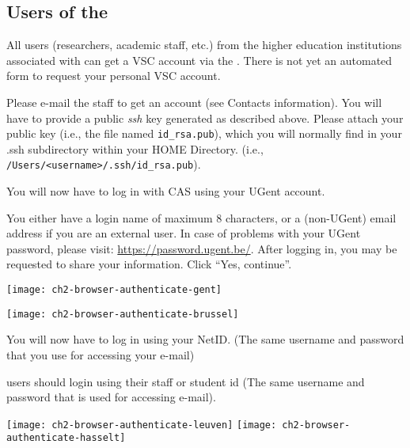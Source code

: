 \subsection{Users of the \association}
\label{sec:users-of-association}

All users (researchers, academic staff, etc.) from the higher education
institutions associated with \university can get a VSC account via the \university. There is not
yet an automated form to request your personal VSC account.

Please e-mail the \hpc staff to get an account (see Contacts information).
You will have to provide a public \emph{ssh} key generated as described
above. Please attach your public key (i.e., the file named \lstinline|id_rsa.pub|),
which you will normally find in your .ssh subdirectory within your HOME
Directory. (i.e., \lstinline|/Users/<username>/.ssh/id_rsa.pub|).


\fi %

\ifgent
  You will now have to log in with CAS using your UGent account.

  You either have a
  login name of maximum 8 characters, or a (non-UGent) email address if you are an external
  user. In case of problems with your UGent password, please visit:
  \url{https://password.ugent.be/}. After logging in, you may be requested
  to share your information. Click ``Yes, continue''.
  \begin{center}
  \texttt{[image: ch2-browser-authenticate-gent]}
  \end{center}
\fi

\ifbrussel
  \begin{center}
  \texttt{[image: ch2-browser-authenticate-brussel]}
  \end{center}

  You will now have to log in using your NetID. (The same username and password that you use for accessing your e-mail)

\fi

\ifleuven
\hpc users should login using their staff or student id
(The same username and password that is used for accessing e-mail).

 \begin{center}
  \texttt{[image: ch2-browser-authenticate-leuven]}
  \texttt{[image: ch2-browser-authenticate-hasselt]}
  \end{center}


